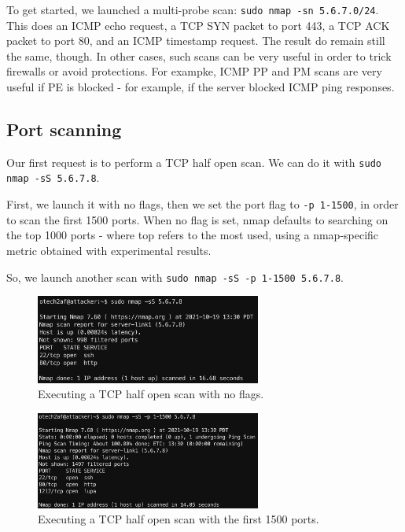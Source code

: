 \documentclass[a4paper,11pt,hidelinks]{article}
\begin{document}
To get started, we launched a multi-probe scan: \verb=sudo nmap -sn 5.6.7.0/24=. This does an ICMP echo request, a TCP SYN packet to port 443, a TCP ACK packet to port 80, and an ICMP timestamp request. The result do remain still the same, though. In other cases, such scans can be very useful in order to trick firewalls or avoid protections. For exampke, ICMP PP and PM scans are very useful if PE is blocked - for example, if the server blocked ICMP ping responses.

\subsection{Port scanning}

Our first request is to perform a TCP half open scan. We can do it with \verb|sudo nmap -sS 5.6.7.8|. 

First, we launch it with no flags, then we set the port flag to \verb|-p 1-1500|, in order to scan the first 1500 ports. When no flag is set, nmap defaults to searching on the top 1000 ports - where top refers to the most used, using a nmap-specific metric obtained with experimental results. 

So, we launch another scan with \verb|sudo nmap -sS -p 1-1500 5.6.7.8|.

\begin{figure}[h!]
  \centering
  \includegraphics[width=0.66\textwidth]{../drawable/enumeration-stealth-top.png}
  \caption{Executing a TCP half open scan with no flags.}
\end{figure}

\begin{figure}[h!]
  \centering
  \includegraphics[width=0.66\textwidth]{../drawable/enumeration-stealth-first1500.png}
  \caption{Executing a TCP half open scan with the first 1500 ports.}
\end{figure}
\end{document}
